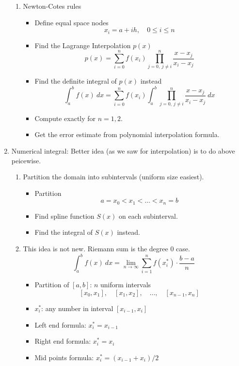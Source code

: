 \documentclass{article}
\theoremstyle{remark}
\begin{document}
\begin{enumerate}
\begin{enumerate}
\item Newton-Cotes rules 
\begin{itemize}
\item Define equal space nodes
$$
x_i  = a+ ih,\quad 0\leq i\leq n
$$
\item Find the Lagrange Interpolation $p(x)$
$$
p(x) = \sum_{i=0}^n f(x_i)\prod_{j=0, ~ j\neq i}^n \frac{x-x_j}{x_i-x_j} 
$$
\item Find the definite integral of $p(x)$ instead
$$
\int_a^b f(x)~dx = \sum_{i=0}^n f(x_i) \int_a^b \prod_{j=0, ~ j\neq i}^n \frac{x-x_j}{x_i-x_j} ~dx
$$
\item Compute exactly for $n=1,2$.
\item Get the error estimate from polynomial interpolation formula.
\end{itemize}
\end{enumerate}

\item Numerical integral: Better idea (as we saw for interpolation) is to do above peicewise.
\begin{enumerate}

\item Partition the domain into subintervals (uniform size easiest).
\begin{itemize}
\item Partition
$$
a = x_0<x_1<\dots<x_n = b
$$
\item Find spline function $S(x)$ on each subinterval.
\item Find the integral of $S(x)$ instead.
\end{itemize}

\item This idea is not new. Riemann sum is the degree 0 case.
$$
\int_a^b f(x)~ dx = \lim_{n\rightarrow \infty}\sum_{i=1}^n f(x_i^*)\cdot \frac{b-a}{n}
$$
\begin{itemize}
\item Partition of $[a,b]$: $n$ uniform intervals
$$
[x_0,x_1],\quad[x_1,x_2],\quad  \dots,\quad [x_{n-1},x_n]
$$
\item $x_i^*$: any number in interval $[x_{i-1},x_i]$
\item Left end formula: $x_i^* = x_{i-1}$
\item Right end formula: $x_i^* = x_{i}$
\item Mid points formula: $x_i^* = (x_{i-1}+x_i)/2$
\end{itemize}


\end{enumerate}
\end{enumerate}
\end{document}
